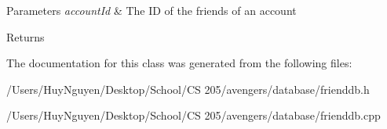 \begin{DoxyParams}{Parameters}
{\em account\+Id} & The ID of the friends of an account \\
\hline
\end{DoxyParams}
\begin{DoxyReturn}{Returns}

\end{DoxyReturn}


The documentation for this class was generated from the following files\+:\begin{DoxyCompactItemize}
\item 
/\+Users/\+Huy\+Nguyen/\+Desktop/\+School/\+C\+S 205/avengers/database/frienddb.\+h\item 
/\+Users/\+Huy\+Nguyen/\+Desktop/\+School/\+C\+S 205/avengers/database/frienddb.\+cpp\end{DoxyCompactItemize}
